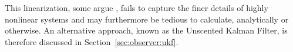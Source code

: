     This linearization, some argue \cite{Julier95anewapproach}, fails to capture the finer details
    of highly nonlinear systems and may furthermore be tedious to
    calculate, analytically or otherwise. An alternative approach, known as the Unscented Kalman Filter, is therefore
    discussed in Section~\ref{sec:observer:ukf}.

